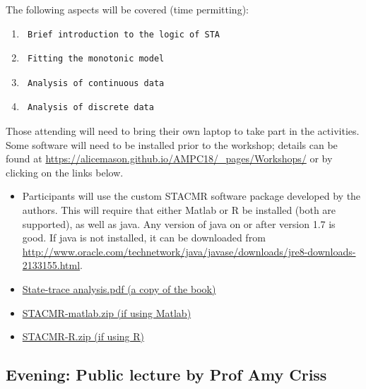 \documentclass[]{article}
\providecommand{\tightlist}{%
  \setlength{\itemsep}{0pt}\setlength{\parskip}{0pt}}
\begin{document}
The following aspects will be covered (time permitting):

\begin{enumerate}
\def\labelenumi{\arabic{enumi}.}
\item
\begin{verbatim}
 Brief introduction to the logic of STA
\end{verbatim}
\item
\begin{verbatim}
 Fitting the monotonic model
\end{verbatim}
\item
\begin{verbatim}
 Analysis of continuous data
\end{verbatim}
\item
\begin{verbatim}
 Analysis of discrete data
\end{verbatim}
\end{enumerate}

Those attending will need to bring their own laptop to take part in the
activities. Some software will need to be installed prior to the
workshop; details can be found at
\url{https://alicemason.github.io/AMPC18/_pages/Workshops/} or by
clicking on the links below.

\begin{itemize}
\tightlist
\item
  Participants will use the custom STACMR software package developed by
  the authors. This will require that either Matlab or R be installed
  (both are supported), as well as java. Any version of java on or after
  version 1.7 is good. If java is not installed, it can be downloaded
  from
  \url{http://www.oracle.com/technetwork/java/javase/downloads/jre8-downloads-2133155.html}.
\item
  \href{https://alicemason.github.io/AMPC18/assets/statetrace/sta.pdf}{State-trace
  analysis.pdf (a copy of the book)}
\item
  \href{https://alicemason.github.io/AMPC18/assets/statetrace/STACMR-matlab.zip}{STACMR-matlab.zip
  (if using Matlab)}
\item
  \href{https://alicemason.github.io/AMPC18/assets/statetrace/STACMR-R.zip}{STACMR-R.zip
  (if using R)}
\end{itemize}

\subsection{Evening: Public lecture by Prof Amy
Criss}\label{evening-public-lecture-by-prof-amy-criss}
\end{document}

